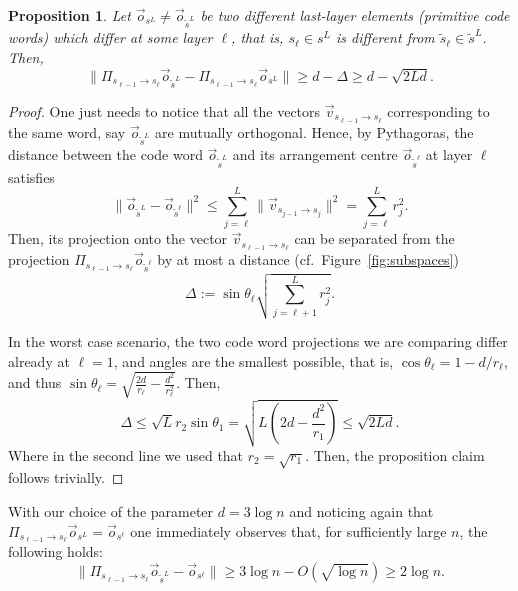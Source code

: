 \documentclass[10pt, conference]{IEEEtran}
\newtheorem{proposition}[theorem]{Proposition}
\newcommand{\1}{\mathds{1}}
\begin{document}
\begin{proposition}\label{proposition:concentration}
Let $\vec o_{s^L}\neq\vec o_{\tilde s^L}$ be two different last-layer elements (primitive code words) which differ at some layer $\ell$, that is, $s_\ell\in s^L$ is different from $\tilde s_\ell\in \tilde s^L$. Then,
\[
\|\Pi_{s_{\ell-1}\to s_\ell}\vec o_{\tilde s^L}-\Pi_{s_{\ell-1}\to s_\ell}\vec o_{s^L}\|\geq d-\Delta\geq d-\sqrt{2Ld}.
\]    
\end{proposition}
\begin{proof}
One just needs to notice that all the vectors $\vec v_{s_{\ell-1}\to s_\ell}$ corresponding to the same word, say $\vec o_{\tilde s^L}$ are mutually orthogonal. Hence, by Pythagoras, the distance between the code word $\vec o_{\tilde s^L}$ and its arrangement centre $\vec o_{\tilde s^\ell}$ at layer $\ell$ satisfies
\begin{equation}
\|\vec o_{\tilde s^L}-\vec o_{\tilde s^\ell}\|^2
\leq\sum_{j=\ell}^L \|\vec v_{s_{j-1}\to s_j}\|^2
=\sum_{j=\ell}^L r_j^2.
\end{equation}
Then, its projection onto the vector $\vec v_{s_{\ell-1}\to s_\ell}$ can be separated from the projection $\Pi_{s_{\ell-1}\to s_\ell}\vec o_{\tilde s^\ell}$ by at most a distance (cf.~Figure~\ref{fig:subspaces})
\begin{equation}\label{eq:delta_def}
    \Delta:=\sin\theta_\ell\sqrt{\sum_{j=\ell+1}^L r_j^2}.
\end{equation}

In the worst case scenario, the two code word projections we are comparing differ already at $\ell=1$, and angles are the smallest possible, that is, $\cos\theta_\ell=1-d/r_\ell$, and thus $\sin\theta_\ell=\sqrt{\frac{2d}{r_\ell}-\frac{d^2}{r_\ell^2}}$. Then,
\begin{equation}
  \Delta\leq\sqrt{L}r_2\sin\theta_1=\sqrt{L\left(2d-\frac{d^2}{r_1}\right)}\leq\sqrt{2Ld}.
\end{equation}
Where in the second line we used that $r_2=\sqrt{r_1}$. Then, the proposition claim follows trivially.
\end{proof}

With our choice of the parameter $d=3\log n$ and noticing again that $\Pi_{s_{\ell-1}\to s_\ell}\vec o_{s^L}=\vec o_{s^\ell}$ one immediately observes that, for sufficiently large $n$, the following holds:
\begin{equation}\label{eq:concentration_property}
\|\Pi_{s_{\ell-1}\to s_\ell}\vec o_{\tilde s^L}-\vec o_{s^\ell}\|\geq 3\log n -O(\sqrt{\log n})\geq 2\log n.
\end{equation}
\end{document}

